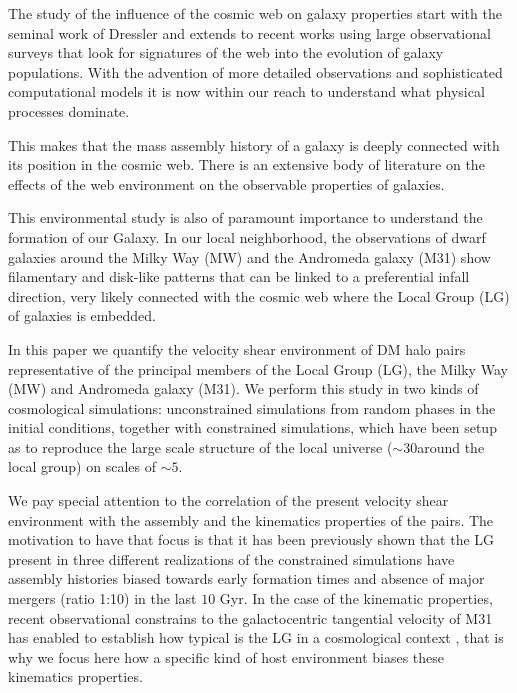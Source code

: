 \documentclass[usenatbib]{latex/mn2e}
\begin{document}
The study of the influence of the cosmic web on galaxy properties start 
with the seminal work of Dressler  and extends to 
recent works using large observational surveys that look for signatures of 
the web into the evolution of galaxy populations. With the advention of 
more detailed observations and sophisticated computational models it is 
now within our reach to understand what physical processes dominate.


This makes  that the mass assembly history of a galaxy is deeply connected 
with its  position in the cosmic web. There is an extensive body of 
literature on the effects of the web environment on the observable 
properties of galaxies. 


This environmental study is also of paramount importance to understand the 
formation of our Galaxy. In our local neighborhood, the observations of 
dwarf galaxies around the Milky Way (MW) and the Andromeda galaxy (M31) 
show filamentary and disk-like patterns that can be linked to a 
preferential infall direction, very likely connected with the cosmic web 
where the Local Group (LG) of galaxies is embedded. 


In this paper we quantify the velocity shear environment of DM halo pairs
representative of the principal members of the Local Group (LG), the Milky
Way (MW) and Andromeda galaxy (M31). We perform this study in two kinds of 
cosmological simulations: unconstrained simulations from random phases in 
the initial conditions, together with constrained simulations, which have 
been setup as to reproduce the large scale structure of the local universe
($\sim 30$\hMpc around the local group) on scales of $\sim 5$\hMpc. 


We pay special attention to the correlation of the present velocity shear 
environment with the assembly and the kinematics properties of the pairs. 
The motivation to have that focus is that it has been previously shown 
that the LG present in three different realizations of the constrained 
simulations have assembly histories biased towards early formation times 
and absence of major mergers (ratio 1:10) in the last $10$ Gyr. In the 
case of the kinematic properties, recent observational constrains to the 
galactocentric tangential velocity of M31 has enabled to establish how 
typical is the LG in a cosmological context , that is why we focus here how a specific kind of 
host environment biases these kinematics properties.


\end{document}
